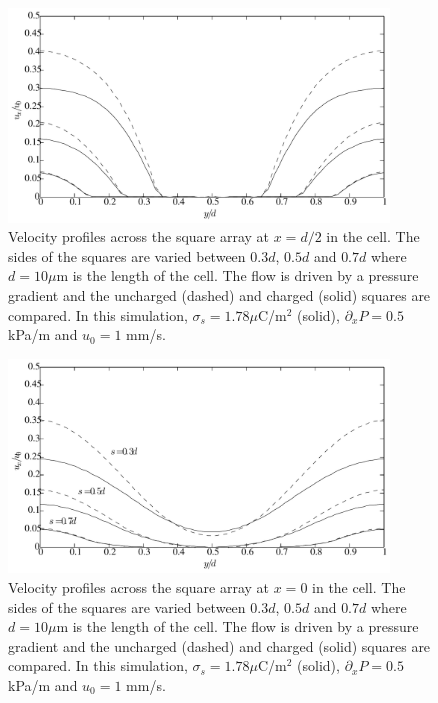 \begin{figure}
\begin{center}
\includegraphics[width=0.9\textwidth]{fig/square_u_mid.pdf}
\end{center}
\caption{Velocity profiles across the square array at $x = d/2$ in the
  cell. The sides of the squares are varied between $0.3d$, $0.5d$ and
  $0.7d$ where $d = 10 \mu$m is the length of the cell. The flow is
  driven by a pressure gradient and the uncharged (dashed) and charged
  (solid) squares are compared. In this simulation, $\sigma_s = 1.78
  \mu$C/m$^2$ (solid), $\partial_xP = 0.5$ kPa/m and $u_0 = 1$ mm/s. }
\label{fig:res:mid}
\end{figure}

\begin{figure}
\begin{center}
\includegraphics[width=0.9\textwidth]{fig/square_pre_u.pdf}
\end{center}
\caption{Velocity profiles across the square array at $x = 0$ in the
  cell. The sides of the squares are varied between $0.3d$, $0.5d$ and
  $0.7d$ where $d = 10 \mu$m is the length of the cell. The flow is
  driven by a pressure gradient and the uncharged (dashed) and charged
  (solid) squares are compared. In this simulation, $\sigma_s = 1.78
  \mu$C/m$^2$ (solid), $\partial_xP = 0.5$ kPa/m and $u_0 = 1$ mm/s. }
\label{fig:res:pre}
\end{figure}
